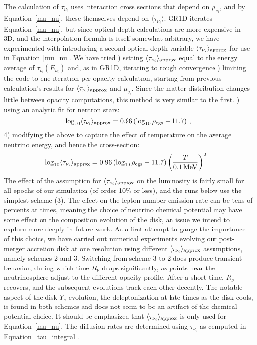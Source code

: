 The calculation of $\tau_{\nu_i}$ uses interaction cross sections
that depend on $\mu_{\nu_i}$, and by Equation~\ref{mu_nu}, these
themselves depend on $\langle\tau_{\nu_i}\rangle$.   GR1D iterates
Equation~\ref{mu_nu}, but since
optical depth calculations are more expensive in 3D, and the
interpolation formula is itself somewhat arbitrary, we have experimented
with introducing a second optical depth variable
$\langle\tau_{\nu_i}\rangle_{\rm approx}$ for use in Equation~\ref{mu_nu}. 
We have tried
) setting $\langle\tau_{\nu_i}\rangle_{\rm approx}$ equal to
the energy average of $\tau_{\nu_i}(E_{\nu_i})$ and, as in GR1D, iterating
to rough convergence
) limiting the code to one iteration per opacity calculation, starting
from previous calculation's results for $\langle\tau_{\nu_i}\rangle_{\rm approx}$
and $\mu_{\nu_i}$.  Since the matter distribution changes little between
opacity computations, this method is very similar to the first.
) using an analytic fit for neutron stars: 
\begin{equation}
\label{tau_nu_rho}
\log_{10}\langle\tau_{\nu_i}\rangle_{\rm approx}=0.96\,(\log_{10}\rho_{\rm cgs}-11.7)\ ,
\end{equation}
4) modifying the above to capture the effect of temperature on the
average neutrino energy, and hence the cross-section:
\begin{equation}
\label{tau_nu_rho_and_T}
\log_{10}\langle\tau_{\nu_i}\rangle_{\rm approx}
=0.96\,(\log_{10}\rho_{\rm cgs}-11.7)\left(\frac{T}{0.1{\,\rm MeV}}\right)^2\ .
\end{equation}
The effect of the assumption for $\langle\tau_{\nu_i}\rangle_{\rm approx}$
on the luminosity is
fairly small for all epochs of our simulation (of order 10\% or less),
and the runs below use the simplest scheme (3).  The effect on
the lepton number emission rate can be tens of percents at times,
meaning the choice of neutrino chemical potential may have some effect
on the composition evolution of the disk, an issue we intend to explore
more deeply in future work. As a first attempt to gauge the importance
of this choice, we have carried out numerical experiments evolving our
post-merger accretion disk at one resolution using different
$\langle\tau_{\nu_i}\rangle_{\rm approx}$ assumptions, namely schemes 2 and 3. 
Switching from scheme 3 to 2 does produce transient behavior, during which time
$R_{\nu}$ drops significantly, as points near the neutrinosphere adjust
to the different opacity profile.  After a short time, $R_{\nu}$
recovers, and the subsequent evolutions track each other decently. 
The notable aspect of the disk $Y_e$ evolution, the deleptonization at late
times as the disk cools, is found in both schemes and does not
seem to be an artifact of the chemical potential choice.
It should be emphasized that
$\langle\tau_{\nu_i}\rangle_{\rm approx}$ is only used for Equation~\ref{mu_nu}. 
The diffusion rates are determined using $\tau_{\nu_i}$ as computed in
Equation~\ref{tau_integral}.

